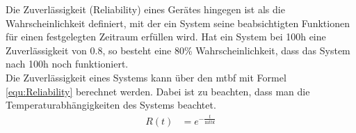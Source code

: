   Die Zuverlässigkeit (Reliability) eines Gerätes hingegen ist als die Wahrscheinlichkeit definiert, mit der ein System seine beabsichtigten Funktionen für einen festgelegten Zeitraum erfüllen wird. Hat ein System bei 100h eine Zuverlässigkeit von 0.8, so besteht eine 80\% Wahrscheinlichkeit, dass das System nach 100h noch funktioniert.\cite{MTBFReliability}\\
  Die Zuverlässigkeit eines Systems kann über den \ac{mtbf} mit Formel \ref{equ:Reliability} berechnet werden. Dabei ist zu beachten, dass man die Temperaturabhängigkeiten des Systems beachtet.
\begin{align}
    && R(t) &= e^{-\frac{t}{\text{mtbf}}} &&
    \label{equ:Reliability} 
\end{align}
